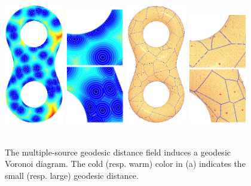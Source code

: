\begin{figure}[htbp]
\centering
\includegraphics[width=0.23\textwidth]{figs/cvt/eight_GVD_seed100_distance_field.png}
\includegraphics[width=0.23\textwidth]{figs/cvt/distance_zoomin_new.png}
\includegraphics[width=0.23\textwidth]{figs/cvt/eight_GVD_seed100_GVD_small.png}
\includegraphics[width=0.23\textwidth]{figs/cvt/zoomin_3.png}\\
 \\
\caption{The multiple-source geodesic distance field induces a geodesic Voronoi diagram. The cold (resp. warm) color in (a) indicates the small (resp. large) geodesic distance.}
\label{fig:gvd}
\end{figure}

